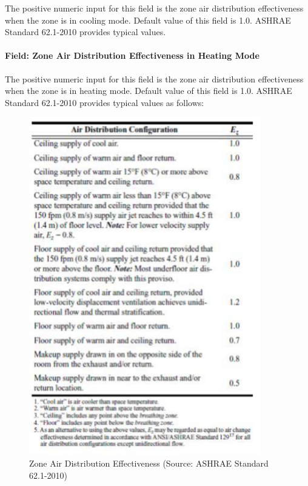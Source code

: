 The positive numeric input for this field is the zone air distribution effectiveness when the zone is in cooling mode. Default value of this field is 1.0. ASHRAE Standard 62.1-2010 provides typical values.

\paragraph{Field: Zone Air Distribution Effectiveness in Heating Mode}\label{field-zone-air-distribution-effectiveness-in-heating-mode}

The positive numeric input for this field is the zone air distribution effectiveness when the zone is in heating mode. Default value of this field is 1.0. ASHRAE Standard 62.1-2010 provides typical values as follows:

\begin{figure}[hbtp] %
\centering
\includegraphics[width=0.9\textwidth, height=0.9\textheight, keepaspectratio=true]{media/image133.png}
\caption{Zone Air Distribution Effectiveness (Source: ASHRAE Standard 62.1-2010) \protect \label{fig:zone-air-distribution-effectiveness-source}}
\end{figure}

